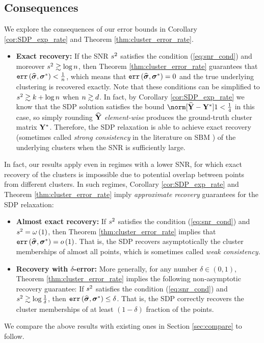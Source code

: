 \subsection{Consequences}

We explore the consequences of our error bounds in Corollary \ref{cor:SDP_exp_rate}
and Theorem \ref{thm:cluster_error_rate}.
\begin{itemize}
\item \textbf{Exact recovery:} If the SNR $s^{2}$ satisfies the condition
(\ref{eq:snr_cond}) and moreover $s^{2}\gtrsim\log n$, then
Theorem \ref{thm:cluster_error_rate} guarantees that $\operatorname*{\texttt{err}}\left(\widehat{\boldsymbol{\sigma}},\boldsymbol{\sigma}^{*}\right)<\frac{1}{n}$,
which means that $\operatorname*{\texttt{err}}\left(\widehat{\boldsymbol{\sigma}},\boldsymbol{\sigma}^{*}\right)=0$ and
the true underlying clustering is recovered exactly. Note that these
conditions can be simplified to $s^{2}\gtrsim k+\log n$
when $n\gtrsim d$. In fact, by Corollary \ref{cor:SDP_exp_rate}
we know that the SDP solution satisfies the bound $\norm[\Yhat-\Ystar]1<\frac{1}{4}$
in this case, so simply rounding $\widehat{\mathbf{Y}}$ \emph{element-wise }produces
the ground-truth cluster matrix $\mathbf{Y}^{*}$. Therefore, the SDP relaxation
is able to achieve exact recovery (sometimes called \emph{strong consistency
}in the literature on SBM \citep{abbe2016recent}) of the underlying
clusters when the SNR is sufficiently large. 
\end{itemize}
In fact, our results apply even in regimes with a lower SNR, for which
exact recovery of the clusters is impossible due to potential overlap
between points from different clusters. In such regimes, Corollary
\ref{cor:SDP_exp_rate} and Theorem \ref{thm:cluster_error_rate}
imply \emph{approximate recovery} guarantees for the SDP relaxation:
\begin{itemize}
\item \textbf{Almost exact recovery:} If $s^{2}$ satisfies the condition
(\ref{eq:snr_cond}) and $s^{2}=\omega\left(1\right)$, then Theorem
\ref{thm:cluster_error_rate} implies that $\operatorname*{\texttt{err}}\left(\widehat{\boldsymbol{\sigma}},\boldsymbol{\sigma}^{*}\right)=o\left(1\right)$.
That is, the SDP recovers asymptotically the cluster memberships of
almost all points, which is sometimes called \emph{weak consistency.}
\item \textbf{Recovery with $\delta$-error:} More generally, for any number
$\delta\in(0,1)$, Theorem \ref{thm:cluster_error_rate} implies the
following non-asymptotic recovery guarantee: If $s^{2}$ satisfies
the condition (\ref{eq:snr_cond}) and $s^{2}\gtrsim\log\frac{1}{\delta}$,
then $\operatorname*{\texttt{err}}\left(\widehat{\boldsymbol{\sigma}},\boldsymbol{\sigma}^{*}\right)\le\delta$. That is,
the SDP correctly recovers the cluster memberships of at least $(1-\delta)$
fraction of the points.
\end{itemize}
We compare the above results with existing ones in Section \ref{sec:compare}
to follow.


